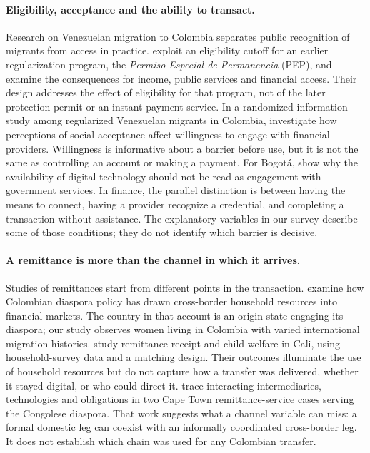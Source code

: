 \documentclass[12pt]{article}
\begin{document}
\paragraph{Eligibility, acceptance and the ability to transact.}
Research on Venezuelan migration to Colombia separates public recognition of migrants from access in practice. \citet{ibanez2025} exploit an eligibility cutoff for an earlier regularization program, the \emph{Permiso Especial de Permanencia} (PEP), and examine the consequences for income, public services and financial access. Their design addresses the effect of eligibility for that program, not of the later protection permit or an instant-payment service. In a randomized information study among regularized Venezuelan migrants in Colombia, \citet{barboni2025} investigate how perceptions of social acceptance affect willingness to engage with financial providers. Willingness is informative about a barrier before use, but it is not the same as controlling an account or making a payment. For Bogotá, \citet{martinshields2022} show why the availability of digital technology should not be read as engagement with government services. In finance, the parallel distinction is between having the means to connect, having a provider recognize a credential, and completing a transaction without assistance. The explanatory variables in our survey describe some of those conditions; they do not identify which barrier is decisive.

\paragraph{A remittance is more than the channel in which it arrives.}
Studies of remittances start from different points in the transaction. \citet{zapata_diaspora_2022} examine how Colombian diaspora policy has drawn cross-border household resources into financial markets. The country in that account is an origin state engaging its diaspora; our study observes women living in Colombia with varied international migration histories. \citet{cuadros_verified_2020} study remittance receipt and child welfare in Cali, using household-survey data and a matching design. Their outcomes illuminate the use of household resources but do not capture how a transfer was delivered, whether it stayed digital, or who could direct it. \citet{cirolia_remittance_2022} trace interacting intermediaries, technologies and obligations in two Cape Town remittance-service cases serving the Congolese diaspora. That work suggests what a channel variable can miss: a formal domestic leg can coexist with an informally coordinated cross-border leg. It does not establish which chain was used for any Colombian transfer.
\end{document}

